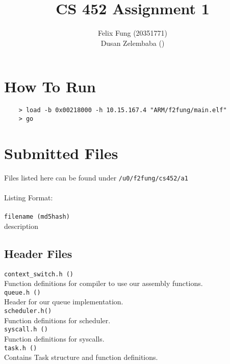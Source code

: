 \documentclass[letterpaper]{article}
\begin{document}
\title{CS 452 Assignment 1}
\author{Felix Fung (20351771) \\ Dusan Zelembaba ()}
\maketitle

\section{How To Run}
\begin{verbatim}
	> load -b 0x00218000 -h 10.15.167.4 "ARM/f2fung/main.elf"
	> go
\end{verbatim}

\section{Submitted Files}
Files listed here can be found under \verb!/u0/f2fung/cs452/a1!\\
\\
Listing Format:\\
\\
\verb!filename (md5hash)!\\
description

\subsection{Header Files}
\verb!context_switch.h ()!\\
Function definitions for compiler to use our assembly functions.\\
\verb!queue.h ()!\\
Header for our queue implementation.\\
\verb!scheduler.h()!\\
Function definitions for scheduler.\\
\verb!syscall.h ()!\\
Function definitions for syscalls.\\
\verb!task.h ()!\\
Contains Task structure and function definitions.\\
\end{document}
